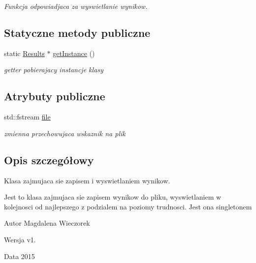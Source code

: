\begin{DoxyCompactItemize}
\begin{DoxyCompactList}\small\item\em Funkcja odpowiadjaca za wyswietlanie wynikow. \end{DoxyCompactList}\end{DoxyCompactItemize}
\subsection*{Statyczne metody publiczne}
\begin{DoxyCompactItemize}
\item 
\hypertarget{class_results_a489b09ca0e160c7d8d43c925a8a33b88}{}static \hyperlink{class_results}{Results} $\ast$ \hyperlink{class_results_a489b09ca0e160c7d8d43c925a8a33b88}{get\+Instance} ()\label{class_results_a489b09ca0e160c7d8d43c925a8a33b88}

\begin{DoxyCompactList}\small\item\em getter pobierajacy instancje klasy \end{DoxyCompactList}\end{DoxyCompactItemize}
\subsection*{Atrybuty publiczne}
\begin{DoxyCompactItemize}
\item 
\hypertarget{class_results_ac3ea8baf9f877af886bb70b259ca464a}{}std\+::fstream \hyperlink{class_results_ac3ea8baf9f877af886bb70b259ca464a}{file}\label{class_results_ac3ea8baf9f877af886bb70b259ca464a}

\begin{DoxyCompactList}\small\item\em zmienna przechowujaca wskaznik na plik \end{DoxyCompactList}\end{DoxyCompactItemize}


\subsection{Opis szczegółowy}
Klasa zajmujaca sie zapisem i wyswietlaniem wynikow. 

Jest to klasa zajmujaca sie zapisem wynikow do pliku, wyswietlaniem w kolejnosci od najlepszego z podzialem na poziomy trudnosci. Jest ona singletonem \begin{DoxyAuthor}{Autor}
Magdalena Wieczorek 
\end{DoxyAuthor}
\begin{DoxyVersion}{Wersja}
v1. 
\end{DoxyVersion}
\begin{DoxyDate}{Data}
2015 
\end{DoxyDate}


